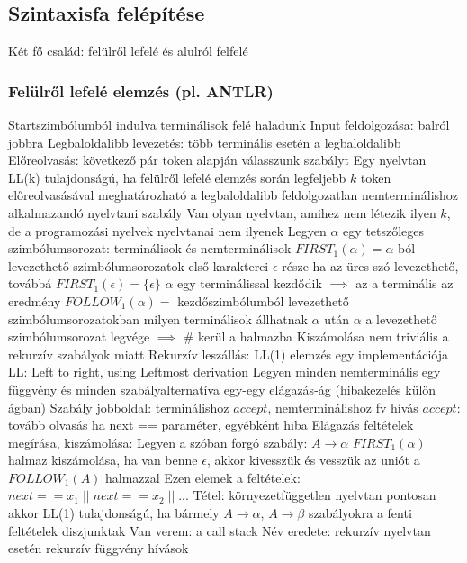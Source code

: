 \documentclass[12pt,a4paper]{article}
\begin{document}
\subsection{Szintaxisfa felépítése}

\begin{outline}
	\1 Két fő család: felülről lefelé és alulról felfelé
\end{outline}

\pagebreak

\subsubsection{Felülről lefelé elemzés (pl. ANTLR)}

\begin{outline}
	\1 Startszimbólumból indulva terminálisok felé haladunk
	\1 Input feldolgozása: balról jobbra
	\1 Legbaloldalibb levezetés: több terminális esetén a legbaloldalibb
	\1 Előreolvasás: következő pár token alapján válasszunk szabályt
		\2 Egy nyelvtan LL(k) tulajdonságú, ha felülről lefelé elemzés során legfeljebb $k$ token előreolvasásával meghatározható a legbaloldalibb feldolgozatlan nemterminálishoz alkalmazandó nyelvtani szabály
		\2 Van olyan nyelvtan, amihez nem létezik ilyen $k$, de a programozási nyelvek nyelvtanai nem ilyenek
	\1 Legyen $\alpha$ egy tetszőleges szimbólumsorozat: terminálisok és nemterminálisok
	\1 $FIRST_1(\alpha) = \alpha$-ból levezethető szimbólumsorozatok első karakterei
		\2 $\epsilon$ része ha az üres szó levezethető, továbbá $FIRST_1(\epsilon) = \{\epsilon\}$
		\2 $\alpha$ egy terminálissal kezdődik $\implies$ az a terminális az eredmény
	\1 $FOLLOW_1(\alpha)=$ kezdőszimbólumból levezethető szimbólumsorozatokban milyen terminálisok állhatnak $\alpha$ után
		\2 $\alpha$ a levezethető szimbólumsorozat legvége $\implies$ \# kerül a halmazba
		\2 Kiszámolása nem triviális a rekurzív szabályok miatt
	\1 Rekurzív leszállás: LL(1) elemzés egy implementációja
		\2 LL: Left to right, using Leftmost derivation
		\2 Legyen minden nemterminális egy függvény és minden szabályalternatíva egy-egy elágazás-ág (hibakezelés külön ágban)
		\2 Szabály jobboldal: terminálishoz $accept$, nemterminálishoz fv hívás
			\3 $accept$: tovább olvasás ha next == paraméter, egyébként hiba
		\2 Elágazás feltételek megírása, kiszámolása:
			\3 Legyen a szóban forgó szabály: $A \to \alpha$
			\3 $FIRST_1(\alpha)$ halmaz kiszámolása, ha van benne $\epsilon$, akkor kivesszük és vesszük az uniót a $FOLLOW_1(A)$ halmazzal
			\3 Ezen elemek a feltételek: $next == x_1 \;||\; next == x_2 \;||\; ...$
		\2 Tétel: környezetfüggetlen nyelvtan pontosan akkor LL(1) tulajdonságú, ha bármely $A \to \alpha$, $A \to \beta$ szabályokra a fenti feltételek diszjunktak
		\2 Van verem: a call stack
		\2 Név eredete: rekurzív nyelvtan esetén rekurzív függvény hívások
\end{outline}
\end{document}
